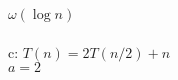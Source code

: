 \documentclass{article}
\begin{document}
                                                                                                                                                                                                                                                                                                                                                                                                                                                                                                                                                                                                                                                                                                                                                                        $\omega(\log{n})$\\
                                                                                                                                                                                                                                                                                                                                                                                                                                                                                                                                                                                                                                                                                                                                                                                \\
                                                                                                                                                                                                                                                                                                                                                                                                                                                                                                                                                                                                                                                                                                                                                                                        c: $T(n) = 2T(n/2) + n$\\
                                                                                                                                                                                                                                                                                                                                                                                                                                                                                                                                                                                                                                                                                                                                                                                                $a=2$\\
\end{document}
